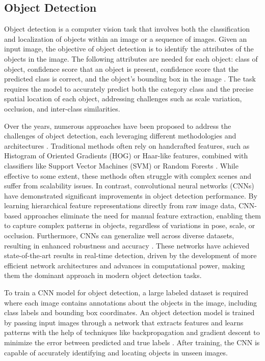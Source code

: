 \documentclass[journal,onecolumn,12pt]{IEEEtran}
\begin{document}
\subsection{Object Detection}
\label{secmAP}
Object detection is a computer vision task that involves both the classification and localization of objects within an image or a sequence of images. Given an input image, the objective of object detection is to identify the attributes of the objects in the image. The following attributes are needed for each object: class of object, confidence score that an object is present, confidence score that the predicted class is correct, and the object's bounding box in the image \cite{8627998}. The task requires the model to accurately predict both the category class and the precise spatial location of each object, addressing challenges such as scale variation, occlusion, and inter-class similarities.

Over the years, numerous approaches have been proposed to address the challenges of object detection, each leveraging different methodologies and architectures \cite{zou2023object}. Traditional methods often rely on handcrafted features, such as Histogram of Oriented Gradients (HOG) or Haar-like features, combined with classifiers like Support Vector Machines (SVM) or Random Forests \cite{10099639}. While effective to some extent, these methods often struggle with complex scenes and suffer from scalability issues. In contrast, convolutional neural networks (CNNs) have demonstrated significant improvements in object detection performance. By learning hierarchical feature representations directly from raw image data, CNN-based approaches eliminate the need for manual feature extraction, enabling them to capture complex patterns in objects, regardless of variations in pose, scale, or occlusion. Furthermore, CNNs can generalize well across diverse datasets, resulting in enhanced robustness and accuracy \cite{cnnvstrad}. These networks have achieved state-of-the-art results in real-time detection, driven by the development of more efficient network architectures and advances in computational power, making them the dominant approach in modern object detection tasks.

To train a CNN model for object detection, a large labeled dataset is required where each image contains annotations about the objects in the image, including class labels and bounding box coordinates. An object detection model is trained by passing input images through a network that extracts features and learns patterns with the help of techniques like backpropagation and gradient descent to minimize the error between predicted and true labels \cite{8825470}. After training, the CNN is capable of accurately identifying and locating objects in unseen images.
\end{document}
